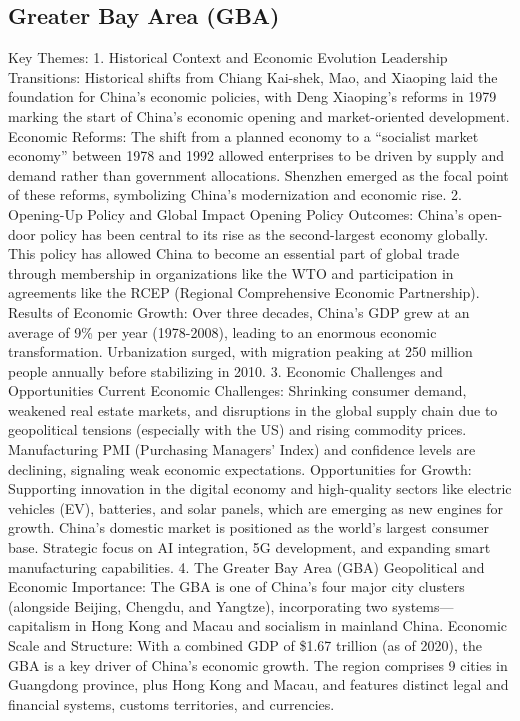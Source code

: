 \subsection{Greater Bay Area (GBA)}
Key Themes:
1. Historical Context and Economic Evolution
Leadership Transitions: Historical shifts from Chiang Kai-shek, Mao, and Xiaoping laid the foundation for China’s economic policies, with Deng Xiaoping’s reforms in 1979 marking the start of China’s economic opening and market-oriented development.
Economic Reforms: The shift from a planned economy to a “socialist market economy” between 1978 and 1992 allowed enterprises to be driven by supply and demand rather than government allocations. Shenzhen emerged as the focal point of these reforms, symbolizing China's modernization and economic rise.
2. Opening-Up Policy and Global Impact
Opening Policy Outcomes: China’s open-door policy has been central to its rise as the second-largest economy globally. This policy has allowed China to become an essential part of global trade through membership in organizations like the WTO and participation in agreements like the RCEP (Regional Comprehensive Economic Partnership).
Results of Economic Growth: Over three decades, China’s GDP grew at an average of 9\% per year (1978-2008), leading to an enormous economic transformation. Urbanization surged, with migration peaking at 250 million people annually before stabilizing in 2010.
3. Economic Challenges and Opportunities
Current Economic Challenges:
Shrinking consumer demand, weakened real estate markets, and disruptions in the global supply chain due to geopolitical tensions (especially with the US) and rising commodity prices.
Manufacturing PMI (Purchasing Managers' Index) and confidence levels are declining, signaling weak economic expectations.
Opportunities for Growth:
Supporting innovation in the digital economy and high-quality sectors like electric vehicles (EV), batteries, and solar panels, which are emerging as new engines for growth. China’s domestic market is positioned as the world’s largest consumer base.
Strategic focus on AI integration, 5G development, and expanding smart manufacturing capabilities.
4. The Greater Bay Area (GBA)
Geopolitical and Economic Importance: The GBA is one of China’s four major city clusters (alongside Beijing, Chengdu, and Yangtze), incorporating two systems—capitalism in Hong Kong and Macau and socialism in mainland China.
Economic Scale and Structure: With a combined GDP of \$1.67 trillion (as of 2020), the GBA is a key driver of China’s economic growth. The region comprises 9 cities in Guangdong province, plus Hong Kong and Macau, and features distinct legal and financial systems, customs territories, and currencies.
